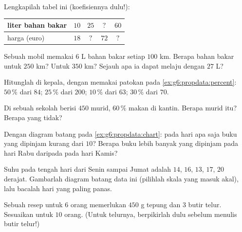 \begin{exercise}[$\star$]\label{exo:g6:propdata:3}
Lengkapilah tabel  ini (koefisiennya dulu!):
\begin{center}
\renewcommand{\arraystretch}{1.2}
\begin{tabular}{l|cccc}
liter bahan bakar & $10$ & $25$ & $?$ & $60$ \\
\hline
harga (euro) & $18$ & $?$ & $72$ & $?$ \\
\end{tabular}
\end{center}
\end{exercise}

\begin{exercise}[$\star$]\label{exo:g6:propdata:4}
Sebuah mobil memakai $6$ L bahan bakar setiap $100$ km. Berapa bahan
bakar untuk $250$ km? Untuk $350$ km? Sejauh apa ia dapat melaju dengan $27$ L?
\end{exercise}

\begin{exercise}[$\star$]\label{exo:g6:propdata:5}
Hitunglah di kepala, dengan memakai patokan pada \cref{ex:g6:propdata:percent}:
$50\,\%$ dari $84$; \quad $25\,\%$ dari $200$; \quad $10\,\%$ dari
$63$; \quad $30\,\%$ dari $70$.
\end{exercise}

\begin{exercise}[$\star$]\label{exo:g6:propdata:6}
Di sebuah sekolah berisi $450$ murid, $60\,\%$ makan di kantin. Berapa
murid itu? Berapa yang tidak?
\end{exercise}

\begin{exercise}[$\star$]\label{exo:g6:propdata:7}
Dengan diagram batang pada \cref{ex:g6:propdata:chart}: pada hari apa
saja buku yang dipinjam kurang dari $10$? Berapa buku lebih banyak
yang dipinjam pada hari Rabu daripada pada hari Kamis?
\end{exercise}

\begin{exercise}[$\star$]\label{exo:g6:propdata:8}
Suhu pada tengah hari dari Senin sampai Jumat adalah $14$, $16$, $13$,
$17$, $20$ derajat. Gambarlah diagram batang data ini (pilihlah skala
yang masuk akal), lalu bacalah hari yang paling panas.
\end{exercise}

\begin{exercise}[$\star\star$]\label{exo:g6:propdata:9}
Sebuah resep untuk $6$ orang memerlukan $450$ g tepung dan $3$ butir
telur. Sesuaikan untuk $10$ orang. (Untuk telurnya, berpikirlah dulu
sebelum menulis  butir telur!)
\end{exercise}

